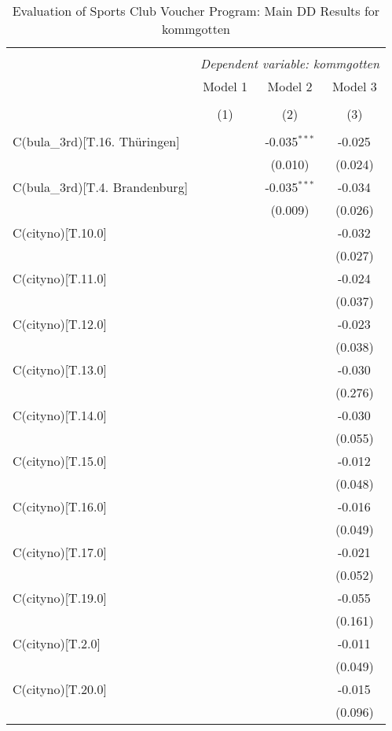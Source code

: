 \begin{table}[!htbp] \centering
  \caption{Evaluation of Sports Club Voucher Program: Main DD Results for kommgotten}
\begin{tabular}{@{\extracolsep{5pt}}lccc}
\\[-1.8ex]\hline
\hline \\[-1.8ex]
& \multicolumn{3}{c}{\textit{Dependent variable: kommgotten}} \
\cr \cline{2-4}
\\[-1.8ex] & \multicolumn{1}{c}{Model 1} & \multicolumn{1}{c}{Model 2} & \multicolumn{1}{c}{Model 3}  \\
\\[-1.8ex] & (1) & (2) & (3) \\
\hline \\[-1.8ex]
 C(bula_3rd)[T.16. Thüringen] & & -0.035$^{***}$ & -0.025$^{}$ \\
& & (0.010) & (0.024) \\
 C(bula_3rd)[T.4. Brandenburg] & & -0.035$^{***}$ & -0.034$^{}$ \\
& & (0.009) & (0.026) \\
 C(cityno)[T.10.0] & & & -0.032$^{}$ \\
& & & (0.027) \\
 C(cityno)[T.11.0] & & & -0.024$^{}$ \\
& & & (0.037) \\
 C(cityno)[T.12.0] & & & -0.023$^{}$ \\
& & & (0.038) \\
 C(cityno)[T.13.0] & & & -0.030$^{}$ \\
& & & (0.276) \\
 C(cityno)[T.14.0] & & & -0.030$^{}$ \\
& & & (0.055) \\
 C(cityno)[T.15.0] & & & -0.012$^{}$ \\
& & & (0.048) \\
 C(cityno)[T.16.0] & & & -0.016$^{}$ \\
& & & (0.049) \\
 C(cityno)[T.17.0] & & & -0.021$^{}$ \\
& & & (0.052) \\
 C(cityno)[T.19.0] & & & -0.055$^{}$ \\
& & & (0.161) \\
 C(cityno)[T.2.0] & & & -0.011$^{}$ \\
& & & (0.049) \\
 C(cityno)[T.20.0] & & & -0.015$^{}$ \\
& & & (0.096) \\

\end{tabular}
\end{table}
